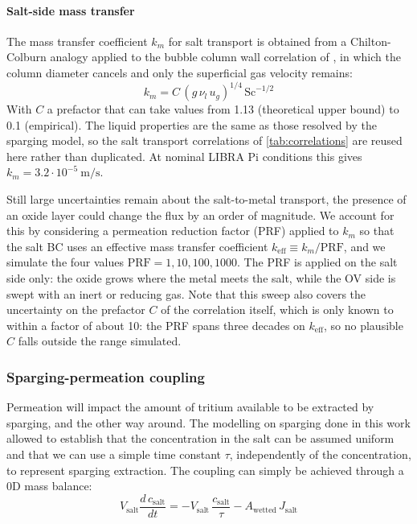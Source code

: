 \documentclass[a4paper,11pt,oneside]{report}
\begin{document}
\paragraph{Salt-side mass transfer}
The mass transfer coefficient $k_m$ for salt transport is obtained from a Chilton-Colburn analogy applied to the bubble column wall correlation of \textcite{deckwer_mechanism_1980}, in which the column diameter cancels and only the superficial gas velocity remains:
\begin{equation}
    k_m=C\,(g\,\nu_l\,u_g)^{1/4}\,\mathrm{Sc}^{-1/2}
\end{equation}
With $C$ a prefactor that can take values from 1.13 (theoretical upper bound) to 0.1 (empirical). The liquid properties are the same as those resolved by the sparging model, so the salt transport correlations of \cref{tab:correlations} are reused here rather than duplicated. At nominal LIBRA Pi conditions this gives $k_m=3.2\cdot10^{-5}\ \mathrm{m/s}$.

Still large uncertainties remain about the salt-to-metal transport, the presence of an oxide layer could change the flux by an order of magnitude. We account for this by considering a permeation reduction factor (PRF) applied to $k_m$ so that the salt BC uses an effective mass transfer coefficient $k_\mathrm{eff}\equiv k_m / \mathrm{PRF}$, and we simulate the four values $\mathrm{PRF}=1, 10, 100, 1000$. The PRF is applied on the salt side only: the oxide grows where the metal meets the salt, while the OV side is swept with an inert or reducing gas. Note that this sweep also covers the uncertainty on the prefactor $C$ of the correlation itself, which is only known to within a factor of about 10: the PRF spans three decades on $k_\mathrm{eff}$, so no plausible $C$ falls outside the range simulated.

\subsubsection{Sparging-permeation coupling}

Permeation will impact the amount of tritium available to be extracted by sparging, and the other way around. The modelling on sparging done in this work allowed to establish that the concentration in the salt can be assumed uniform and that we can use a simple time constant $\tau$, independently of the concentration, to represent sparging extraction. The coupling can simply be achieved through a 0D mass balance:
\begin{equation}
\label{eq:salt_balance}
    V_\mathrm{salt}\frac{d\,c_\mathrm{salt}}{dt}=-V_\mathrm{salt}\,\frac{c_\mathrm{salt}}{\tau}-A_\mathrm{wetted}\,J_\mathrm{salt}
\end{equation}
\end{document}
